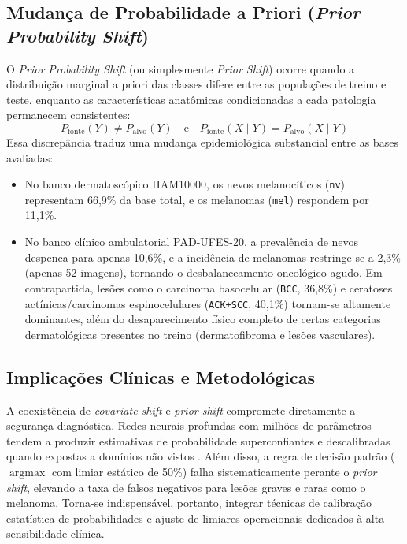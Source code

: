\documentclass[oneside,english,brazilian]{UNISINOSmonografia}
\begin{document}
\subsection{Mudança de Probabilidade a Priori (\textit{Prior Probability Shift})}
O \textit{Prior Probability Shift} (ou simplesmente \textit{Prior Shift}) ocorre quando a distribuição marginal a priori das classes difere entre as populações de treino e teste, enquanto as características anatômicas condicionadas a cada patologia permanecem consistentes:
\begin{equation}
    P_{\text{fonte}}(Y) \neq P_{\text{alvo}}(Y) \quad \text{e} \quad P_{\text{fonte}}(X \mid Y) = P_{\text{alvo}}(X \mid Y)
\end{equation}
Essa discrepância traduz uma mudança epidemiológica substancial entre as bases avaliadas:
\begin{itemize}
    \item No banco dermatoscópico HAM10000, os nevos melanocíticos (\texttt{nv}) representam 66,9\% da base total, e os melanomas (\texttt{mel}) respondem por 11,1\%.
    \item No banco clínico ambulatorial PAD-UFES-20, a prevalência de nevos despenca para apenas 10,6\%, e a incidência de melanomas restringe-se a 2,3\% (apenas 52 imagens), tornando o desbalanceamento oncológico agudo. Em contrapartida, lesões como o carcinoma basocelular (\texttt{BCC}, 36,8\%) e ceratoses actínicas/carcinomas espinocelulares (\texttt{ACK+SCC}, 40,1\%) tornam-se altamente dominantes, além do desaparecimento físico completo de certas categorias dermatológicas presentes no treino (dermatofibroma e lesões vasculares).
\end{itemize}

\subsection{Implicações Clínicas e Metodológicas}
A coexistência de \textit{covariate shift} e \textit{prior shift} compromete diretamente a segurança diagnóstica. Redes neurais profundas com milhões de parâmetros tendem a produzir estimativas de probabilidade superconfiantes e descalibradas quando expostas a domínios não vistos \cite{guo2017calibration}. Além disso, a regra de decisão padrão ($\operatorname{argmax}$ com limiar estático de 50\%) falha sistematicamente perante o \textit{prior shift}, elevando a taxa de falsos negativos para lesões graves e raras como o melanoma. Torna-se indispensável, portanto, integrar técnicas de calibração estatística de probabilidades e ajuste de limiares operacionais dedicados à alta sensibilidade clínica.
\end{document}
